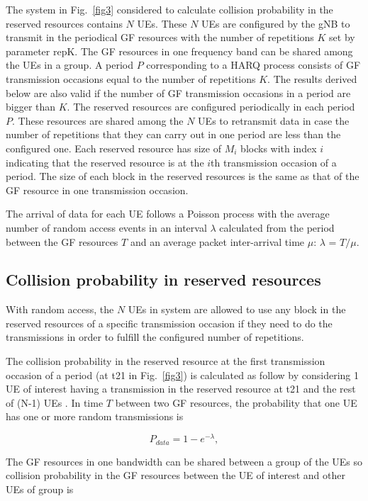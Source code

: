 \documentclass[conference]{IEEEtran}
\begin{document}
The system in Fig.~\ref{fig3} considered to calculate collision probability in the reserved resources contains $N$ UEs. These $N$ UEs are configured by the gNB to transmit in the periodical GF resources with the number of repetitions $K$ set by parameter repK. The GF resources in one frequency band can be shared among the UEs in a group. A period $P$ corresponding to a HARQ process consists of GF transmission occasions equal to the number of repetitions $K$. The results derived below are also valid if the number of GF transmission occasions in a period are bigger than $K$. 
The reserved resources are configured periodically in each period $P$. These resources are shared among the $N$ UEs to retransmit data in case the number of repetitions that they can carry out in one period are less than the configured one. Each reserved resource has size of $M_{i}$ blocks with index $i$ indicating that the reserved resource is at the $i$th transmission occasion of a period. The size of each block in the reserved resources is the same as that of the GF resource in one transmission occasion.

The arrival of data for each UE follows a Poisson process with the average number of random access events in an interval $\lambda$ calculated from the period between the GF resources $T$ and an average packet inter-arrival time $\mu$: $\lambda$ = $T/\mu$.

\subsection{Collision probability in reserved resources}\label{IICC}
With random access, the $N$ UEs in system are allowed to use any block in the reserved resources of a specific transmission occasion if they need to do the transmissions in order to fulfill the configured number of repetitions.

The collision probability in the reserved resource at the first transmission occasion of a period (at t21 in Fig.~\ref{fig3}) is calculated as follow by considering 1 UE of interest having a transmission in the reserved resource at t21 and the rest of (N-1) UEs . 
In time $T$ between two GF resources, the probability that one UE has one or more random transmissions is 

\begin{equation}
P_{data} = 1 - e^{-\lambda},\label{eq1}
\end{equation}

The GF resources in one bandwidth can be shared between a group of the UEs so collision probability in the GF resources between the UE of interest and other UEs of group is
\end{document}
